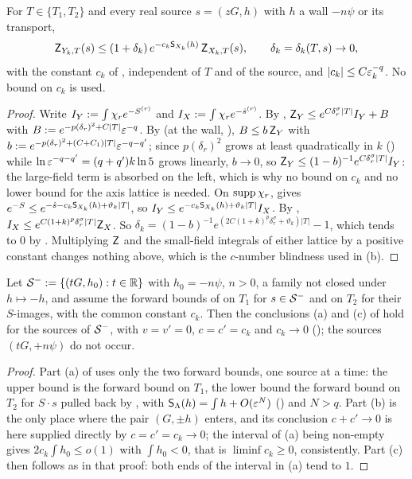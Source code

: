 \begin{proposition}\label{rot:prop:Kforward}
For $T\in\{T_1,T_2\}$ and every real source $s=(zG,h)$ with $h$ a wall $-n\psi$ or its transport,
\[
\mathsf Z_{Y_k,T}(s)\le(1+\delta_k)\,e^{-c_k\mathsf S_{X_k}(h)}\,\mathsf Z_{X_k,T}(s),\qquad\delta_k=\delta_k(T,s)\to0,
\]
with the constant $c_k$ of , independent of $T$ and of the source, and $|c_k|\le C\varepsilon_k^{-q}$. No bound on $c_k$ is used.
\end{proposition}
\begin{proof}
Write $I_Y:=\int\chi_re^{-S^{(r)}}$ and $I_X:=\int\chi_re^{-\hat s^{(r)}}$. By , $\mathsf Z_Y\le e^{C\delta_r^\sigma|T|}I_Y+B$ with $B:= e^{-p(\delta_r)^2+C|T|}\varepsilon^{-q}$. By  (at the wall, ), $B\le b\,\mathsf Z_Y$ with $b:= e^{-p(\delta_r)^2+(C+C_1)|T|}\varepsilon^{-q-q'}$; since $p(\delta_r)^2$ grows at least quadratically in $k$ () while $\ln\varepsilon^{-q-q'}=(q+q')k\ln5$ grows linearly, $b\to0$, so $\mathsf Z_Y\le(1-b)^{-1}e^{C\delta_r^\sigma|T|}I_Y$: the large-field term is absorbed on the left, which is why no bound on $c_k$ and no lower bound for the axis lattice is needed. On $\operatorname{supp}\chi_r$,  gives $e^{-S}\le e^{-\hat s-c_k\mathsf S_{X_k}(h)+\vartheta_k|T|}$, so $I_Y\le e^{-c_k\mathsf S_{X_k}(h)+\vartheta_k|T|}I_X$. By , $I_X\le e^{C(1+k)^p\delta_r^\sigma|T|}\mathsf Z_X$. So $\delta_k=(1-b)^{-1}e^{(2C(1+k)^p\delta_r^\sigma+\vartheta_k)|T|}-1$, which tends to $0$ by . Multiplying $\mathsf Z$ and the small-field integrals of either lattice by a positive constant changes nothing above, which is the $c$-number blindness used in (b).
\end{proof}

\begin{proposition}\label{rot:prop:Konly}
Let $\mathcal S^-:=\{(tG,h_0):t\in\mathbb R\}$ with $h_0=-n\psi$, $n>0$, a family not closed under $h\mapsto-h$, and assume the forward bounds of  on $T_1$ for $s\in\mathcal S^-$ and on $T_2$ for their $S$-images, with the common constant $c_k$. Then the conclusions \textup{(a)} and \textup{(c)} of  hold for the sources of $\mathcal S^-$, with $v=v'=0$, $c=c'=c_k$ and $c_k\to0$ (); the sources $(tG,+n\psi)$ do not occur.
\end{proposition}
\begin{proof}
Part (a) of  uses only the two forward bounds, one source at a time: the upper bound is the forward bound on $T_1$, the lower bound the forward bound on $T_2$ for $S\cdot s$ pulled back by , with $\mathsf S_{\Lambda}(h)=\int h+O(\varepsilon^N)$ () and $N>q$. Part (b) is the only place where the pair $(G,\pm h)$ enters, and its conclusion $c+c'\to0$ is here supplied directly by $c=c'=c_k\to0$; the interval of (a) being non-empty gives $2c_k\int h_0\le o(1)$ with $\int h_0<0$, that is $\liminf c_k\ge0$, consistently. Part (c) then follows as in that proof: both ends of the interval in (a) tend to $1$.
\end{proof}


